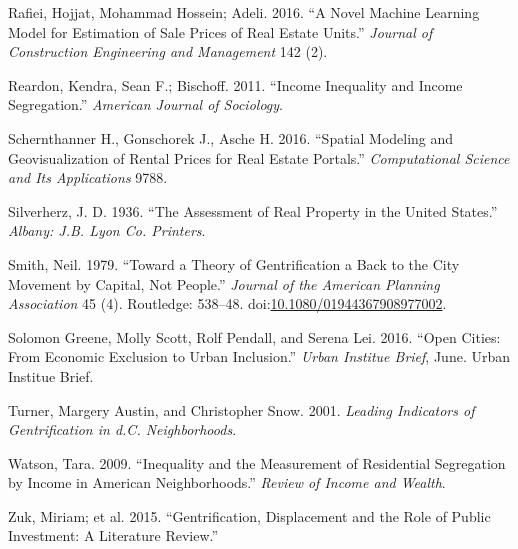 \documentclass[]{article}
\begin{document}
\hypertarget{ref-Rafiei2016}{}
Rafiei, Hojjat, Mohammad Hossein; Adeli. 2016. ``A Novel Machine
Learning Model for Estimation of Sale Prices of Real Estate Units.''
\emph{Journal of Construction Engineering and Management} 142 (2).

\hypertarget{ref-Reardon2011}{}
Reardon, Kendra, Sean F.; Bischoff. 2011. ``Income Inequality and Income
Segregation.'' \emph{American Journal of Sociology}.

\hypertarget{ref-Schernthanner2016}{}
Schernthanner H., Gonschorek J., Asche H. 2016. ``Spatial Modeling and
Geovisualization of Rental Prices for Real Estate Portals.''
\emph{Computational Science and Its Applications} 9788.

\hypertarget{ref-Silverherz1936}{}
Silverherz, J. D. 1936. ``The Assessment of Real Property in the United
States.'' \emph{Albany: J.B. Lyon Co. Printers}.

\hypertarget{ref-Smith1979}{}
Smith, Neil. 1979. ``Toward a Theory of Gentrification a Back to the
City Movement by Capital, Not People.'' \emph{Journal of the American
Planning Association} 45 (4). Routledge: 538--48.
doi:\href{https://doi.org/10.1080/01944367908977002}{10.1080/01944367908977002}.

\hypertarget{ref-urban2016}{}
Solomon Greene, Molly Scott, Rolf Pendall, and Serena Lei. 2016. ``Open
Cities: From Economic Exclusion to Urban Inclusion.'' \emph{Urban
Institue Brief}, June. Urban Institue Brief.

\hypertarget{ref-Turner2001}{}
Turner, Margery Austin, and Christopher Snow. 2001. \emph{Leading
Indicators of Gentrification in d.C. Neighborhoods}.

\hypertarget{ref-Watson2009}{}
Watson, Tara. 2009. ``Inequality and the Measurement of Residential
Segregation by Income in American Neighborhoods.'' \emph{Review of
Income and Wealth}.

\hypertarget{ref-Zuk2015}{}
Zuk, Miriam; et al. 2015. ``Gentrification, Displacement and the Role of
Public Investment: A Literature Review.''
\end{document}
